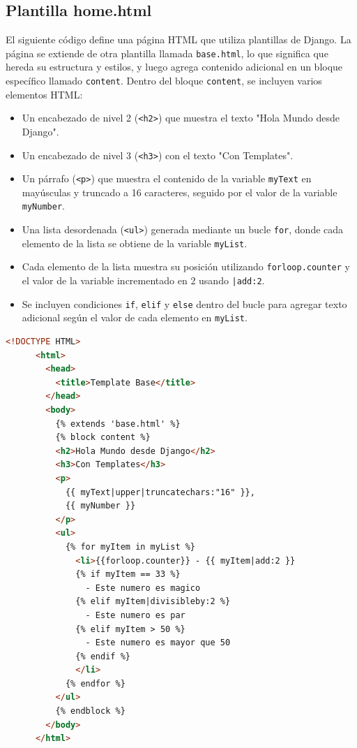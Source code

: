 \documentclass{article}
\begin{document}
  \subsection{Plantilla home.html}
    El siguiente código define una página HTML que utiliza plantillas de Django. La página se extiende de otra plantilla 
    llamada \texttt{base.html}, lo que significa que hereda su estructura y estilos, y luego agrega contenido adicional en 
    un bloque específico llamado \texttt{content}.
    Dentro del bloque \texttt{content}, se incluyen varios elementos HTML:
      \begin{itemize}
        \item Un encabezado de nivel 2 (\texttt{<h2>}) que muestra el texto "Hola Mundo desde Django".
        \item Un encabezado de nivel 3 (\texttt{<h3>}) con el texto "Con Templates".
        \item Un párrafo (\texttt{<p>}) que muestra el contenido de la variable \texttt{myText} en mayúsculas y truncado a 16 caracteres, seguido por el valor de la variable \texttt{myNumber}.
        \item Una lista desordenada (\texttt{<ul>}) generada mediante un bucle \texttt{for}, donde cada elemento de la lista se obtiene de la variable \texttt{myList}.
        \item Cada elemento de la lista muestra su posición utilizando \texttt{forloop.counter} y el valor de la variable incrementado en 2 usando \texttt{|add:2}.
        \item Se incluyen condiciones \texttt{if}, \texttt{elif} y \texttt{else} dentro del bucle para agregar texto adicional según el valor de cada elemento en \texttt{myList}.
      \end{itemize}
    \begin{lstlisting}[language=html]
      <!DOCTYPE HTML>
      <html>
        <head>
          <title>Template Base</title>
        </head>
        <body>
          {% extends 'base.html' %}
          {% block content %}
          <h2>Hola Mundo desde Django</h2>
          <h3>Con Templates</h3>
          <p>
            {{ myText|upper|truncatechars:"16" }},
            {{ myNumber }}
          </p>
          <ul>
            {% for myItem in myList %}
              <li>{{forloop.counter}} - {{ myItem|add:2 }}
              {% if myItem == 33 %}
                - Este numero es magico
              {% elif myItem|divisibleby:2 %}
                - Este numero es par
              {% elif myItem > 50 %}
                - Este numero es mayor que 50
              {% endif %}
              </li>
            {% endfor %}
          </ul>
          {% endblock %}
        </body>
      </html>
    \end{lstlisting}
\end{document}

